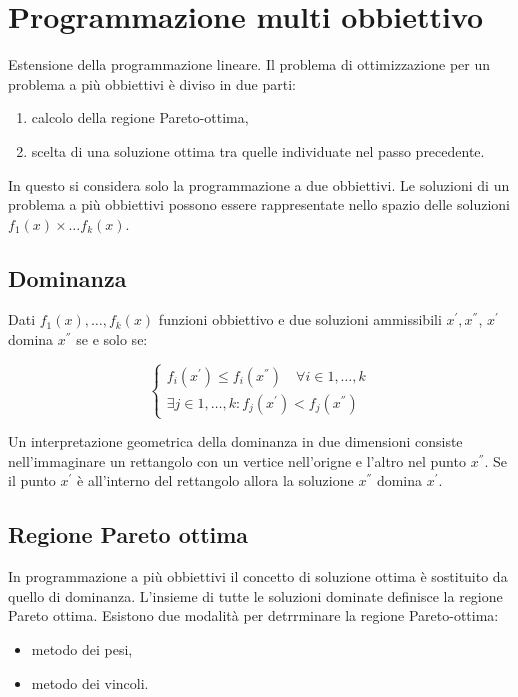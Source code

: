 \section{Programmazione multi obbiettivo}
Estensione della programmazione lineare. Il problema di ottimizzazione per un problema a più obbiettivi è diviso in due parti:

\begin{enumerate}
	\item calcolo della regione Pareto-ottima,
	\item scelta di una soluzione ottima tra quelle individuate nel passo precedente.
\end{enumerate}

In questo si considera solo la programmazione a due obbiettivi. Le soluzioni di un problema a più obbiettivi possono essere rappresentate nello spazio delle soluzioni $f_1(x) \times \dotsc f_k(x)$.

\subsection{Dominanza}
Dati $f_1(x), \dotsc, f_k(x)$ funzioni obbiettivo e due soluzioni ammissibili $x^{'}, x^{''}$, $x^{'}$ domina $x^{''}$ se e solo se:

\begin{equation}\label{dominanza}
	\begin{cases}
		f_i(x^{'}) \leq f_i(x^{''}) \quad \forall i \in 1, \dotsc, k \\
		\exists j \in 1, \dotsc, k : f_j(x^{'}) < f_j(x^{''})
	\end{cases}
\end{equation}

Un interpretazione geometrica della dominanza in due dimensioni consiste nell'immaginare un rettangolo con un vertice nell'origne e l'altro nel punto $x^{''}$. Se il punto $x^{'}$ è all'interno del rettangolo allora la soluzione $x^{''}$ domina $x^{'}$.

\subsection{Regione Pareto ottima}
In programmazione a più obbiettivi il concetto di soluzione ottima è sostituito da quello di dominanza. L'insieme di tutte le soluzioni dominate definisce la regione Pareto ottima. Esistono due modalità per detrrminare la regione Pareto-ottima:

\begin{itemize}
	\item metodo dei pesi,
	\item metodo dei vincoli.
\end{itemize}

